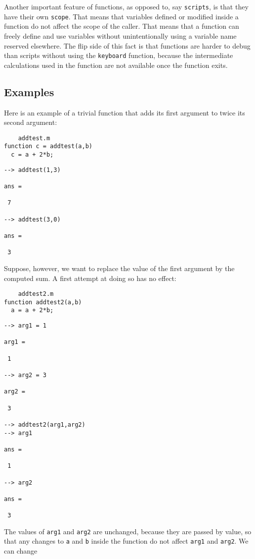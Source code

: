 Another important feature of functions, as opposed to, say \verb|scripts|,
is that they have their own \verb|scope|.  That means that variables
defined or modified inside a function do not affect the scope of the
caller.  That means that a function can freely define and use variables
without unintentionally using a variable name reserved elsewhere.  The
flip side of this fact is that functions are harder to debug than
scripts without using the \verb|keyboard| function, because the intermediate
calculations used in the function are not available once the function
exits.
\subsection{Examples}

Here is an example of a trivial function that adds its
first argument to twice its second argument:
\begin{verbatim}
    addtest.m
function c = addtest(a,b)
  c = a + 2*b;
\end{verbatim}
\begin{verbatim}
--> addtest(1,3)

ans = 

 7 

--> addtest(3,0)

ans = 

 3 
\end{verbatim}
Suppose, however, we want to replace the value of the first 
argument by the computed sum.  A first attempt at doing so
has no effect:
\begin{verbatim}
    addtest2.m
function addtest2(a,b)
  a = a + 2*b;
\end{verbatim}
\begin{verbatim}
--> arg1 = 1

arg1 = 

 1 

--> arg2 = 3

arg2 = 

 3 

--> addtest2(arg1,arg2)
--> arg1

ans = 

 1 

--> arg2

ans = 

 3 
\end{verbatim}
The values of \verb|arg1| and \verb|arg2| are unchanged, because they are
passed by value, so that any changes to \verb|a| and \verb|b| inside 
the function do not affect \verb|arg1| and \verb|arg2|.  We can change
